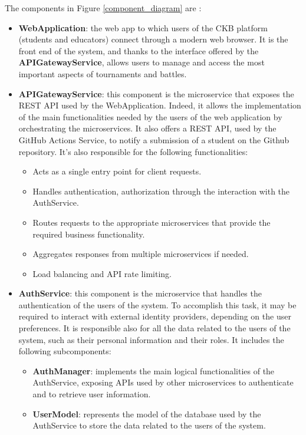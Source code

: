 The components in Figure \ref{component_diagram} are :
\begin{itemize}
    \item \textbf{WebApplication}: the web app to which users of the CKB platform (students and educators) connect through a modern web browser. It is the front end of the system, and thanks to the interface offered by the \textbf{APIGatewayService}, allows users to manage and access the most important aspects of tournaments and battles.
    \item \textbf{APIGatewayService}: this component is the microservice that exposes the REST API used by the WebApplication. Indeed, it allows the implementation of the main functionalities needed by the users of the web application by orchestrating the microservices. It also offers a REST API, used by the GitHub Actions Service, to notify a submission of a student on the Github repository.
    It's also responsible for the following functionalities:
    \begin{itemize}
        \item Acts as a single entry point for client requests.
        \item Handles authentication, authorization through the interaction with the AuthService.
        \item Routes requests to the appropriate microservices that provide the required business functionality.
        \item Aggregates responses from multiple microservices if needed.
        \item Load balancing and API rate limiting.
    \end{itemize}
    \item \textbf{AuthService}: this component is the microservice that handles the authentication of the users of the system. To accomplish this task, it may be required to interact with external identity providers, depending on the user preferences. 
    It is responsible also for all the data related to the users of the system, such as their personal information and their roles. It includes the following subcomponents:
    \begin{itemize}
        \item \textbf{AuthManager}: implements the main logical functionalities of the AuthService, exposing APIs used by other microservices to authenticate and to retrieve user information.
        \item \textbf{UserModel}: represents the model of the database used by the AuthService to store the data related to the users of the system.

\end{itemize}
\end{itemize}
